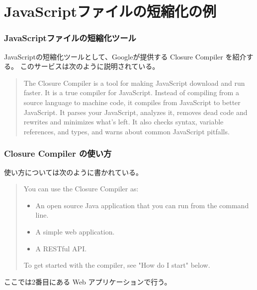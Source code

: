 \documentclass[dvipsk]{beamer}
\begin{document}
\section{JavaScriptファイルの短縮化の例}
\begin{frame}[containsverbatim]
 \frametitle{JavaScriptファイルの短縮化ツール}
 JavaScriptの短縮化ツールとして、Googleが提供する
 Closure Compiler を紹介する。
 このサービスは次のように説明されている。
\begin{quotation}
 The Closure Compiler is a tool for making JavaScript download and run
 faster. It is a true compiler for JavaScript. Instead of compiling from
 a source language to machine code, it compiles from JavaScript to
 better JavaScript. It parses your JavaScript, analyzes it, removes dead
 code and rewrites and minimizes what's left. It also checks syntax,
 variable references, and types, and warns about common JavaScript
 pitfalls. 
\end{quotation}
\end{frame}
\begin{frame}[containsverbatim]
\frametitle{Closure Compiler の使い方}
使い方については次のように書かれている。
\begin{quotation}
 You can use the Closure Compiler as:

\begin{itemize}
 \item An open source Java application that you can run from the command
			 line.
 \item A simple web application.
 \item A RESTful API.
\end{itemize}
To get started with the compiler, see "How do I start" below.
\end{quotation}
ここでは2番目にある Web アプリケーションで行う。
\end{frame}
\end{document}
